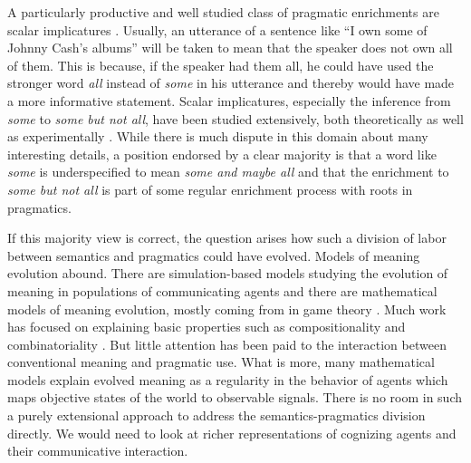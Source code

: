 \documentclass[a4paper]{article}
\begin{document}
A particularly productive and well studied class of pragmatic enrichments are scalar
implicatures
\citep{horn:1984,Hirschberg1985:A-Theory-of-Sca,LevinsonPragmatics1983,Geurts2010:Quantity-Implic}. Usually,
an utterance of a sentence like ``I own some of Johnny Cash's albums'' will be taken to mean
that the speaker does not own all of them. This is because, if the speaker had them all, he
could have used the stronger word \emph{all} instead of \emph{some} in his utterance and
thereby would have made a more informative statement. Scalar implicatures, especially the
inference from \emph{some} to \emph{some but not all}, have been studied extensively, both
theoretically
\citep[e.g.][]{Sauerland2004:Scalar-Implicat,ChierchiaFox2008:The-Grammatical,Rooyvan-RooijJagerde-Jager2012:Explaining-Quan}
as well as experimentally
\citep[e.g.][]{BottNoveck2004:Some-Utterances,huang+snedeker:2009,GrodnerKlein2010:Some-and-Possib,GoodmanStuhlmuller2013:Knowledge-and-I,DegenTanenhaus2012:Processing-Scal}. While
there is much dispute in this domain about many interesting details, a position endorsed by a
clear majority is that a word like \emph{some} is underspecified to mean \emph{some and maybe
  all} and that the enrichment to \emph{some but not all} is part of some regular enrichment
process with roots in pragmatics.

If this majority view is correct, the question arises how such a division of labor between
semantics and pragmatics could have evolved. Models of meaning evolution abound. There are
simulation-based models studying the evolution of meaning in populations of communicating
agents
\citep{Hurford1989:Biological-Evol,Steels1995:A-Self-Organizi,LenaertsJansen2005:The-Evolutionar,SteelsBelpaeme2005:Coordinating-Pe,BaronchelliPuglisi2008:Cultural-route-,steels:2011,SpikeStadler2016:Minimal-Require}
and there are mathematical models of meaning evolution, mostly coming from in game theory
\citep{lewis:1969,Warneryd1993:Cheap-Talk-Coor,BlumeKim1993:Evolutionary-St,nowak+krakauer:1999,Huttegger2007:Evolution-and-t,Skyrms2010:Signals}. Much
work has focused on explaining basic properties such as compositionality and combinatoriality
\citep[e.g.][]{Batali1998:Computational-S,nowak+krakauer:1999,nowak+etal:2000,KirbyHurford2002:The-Emergence-o,kirby:2002,SmithKirby2003:Iterated-Learni,Gong2007:Language-Evolut,kirby+etal:2015,verhoef+etal:2014,Franke2015:Proto-Syntax}. But
little attention has been paid to the interaction between conventional meaning and pragmatic
use. What is more, many mathematical models explain evolved meaning as a regularity in the
behavior of agents which maps objective states of the world to observable signals. There is no
room in such a purely extensional approach to address the semantics-pragmatics division
directly. We would need to look at richer representations of cognizing agents and their
communicative interaction.
\end{document}
